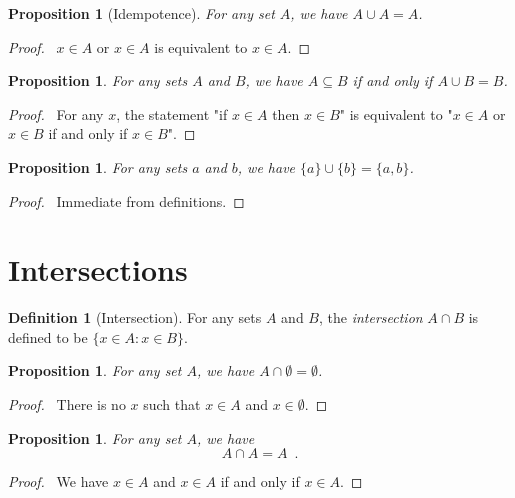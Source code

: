 \documentclass{report}
\let\qed\relax
\newtheorem{prop}[ax]{Proposition}
\theoremstyle{definition}
\newtheorem{df}[ax]{Definition}
\begin{document}
\begin{prop}[Idempotence]
For any set $A$, we have $A \cup A = A$.
\end{prop}

\begin{proof}
\pf\ $x \in A$ or $x \in A$ is equivalent to $x \in A$. \qed
\end{proof}

\begin{prop}
For any sets $A$ and $B$, we have $A \subseteq B$ if and only if $A \cup B = B$.
\end{prop}

\begin{proof}
\pf\ For any $x$, the statement "if $x \in A$ then $x \in B$" is equivalent to "$x \in A$ or $x \in B$ if and only if $x \in B$". \qed
\end{proof}

\begin{prop}
For any sets $a$ and $b$, we have $\{a\} \cup \{b\} = \{a,b\}$.
\end{prop}

\begin{proof}
\pf\ Immediate from definitions. \qed
\end{proof}

\section{Intersections}

\begin{df}[Intersection]
For any sets $A$ and $B$, the \emph{intersection} $A \cap B$ is defined to be $\{ x \in A : x \in B \}$.
\end{df}

\begin{prop}
For any set $A$, we have $A \cap \emptyset = \emptyset$.
\end{prop}

\begin{proof}
\pf\ There is no $x$ such that $x \in A$ and $x \in \emptyset$. \qed
\end{proof}

\begin{prop}
For any set $A$, we have
\[ A \cap A = A \enspace . \]
\end{prop}

\begin{proof}
\pf\ We have $x \in A$ and $x \in A$ if and only if $x \in A$. \qed
\end{proof}
\end{document}

